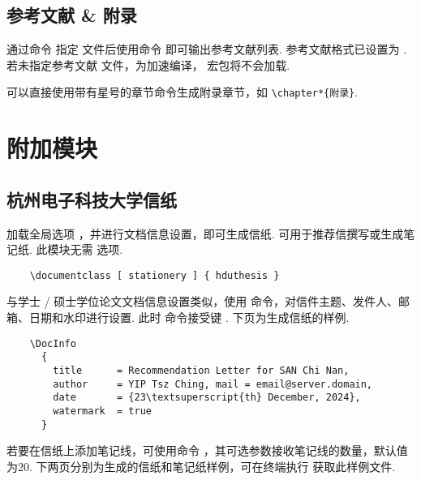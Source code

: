 \subsection{参考文献 \& 附录}

通过命令  指定  文件后使用命令  即可输出参考文献列表. 参考文献格式已设置为 . 若未指定参考文献  文件，为加速编译， 宏包将不会加载.

可以直接使用带有星号的章节命令生成附录章节，如 \verb|\chapter*{附录}|.

\clearpage

\section{附加模块}

\subsection{杭州电子科技大学信纸}

加载全局选项 ，并进行文档信息设置，即可生成信纸. 可用于推荐信撰写或生成笔记纸.
此模块无需  选项.

\begin{framed}
  \begin{verbatim}
    \documentclass [ stationery ] { hduthesis }
  \end{verbatim}
\end{framed}

与学士 / 硕士学位论文文档信息设置类似，使用  命令，对信件主题、发件人、邮箱、日期和水印进行设置. 此时  命令接受键
  
 . 下页为生成信纸的样例.

\begin{framed}
  \begin{verbatim}
    \DocInfo
      {
        title      = Recommendation Letter for SAN Chi Nan,
        author     = YIP Tsz Ching, mail = email@server.domain,
        date       = {23\textsuperscript{th} December, 2024},
        watermark  = true
      }
  \end{verbatim}
\end{framed}

若要在信纸上添加笔记线，可使用命令 ，其可选参数接收笔记线的数量，默认值为20. 下两页分别为生成的信纸和笔记纸样例，可在终端执行  获取此样例文件.

